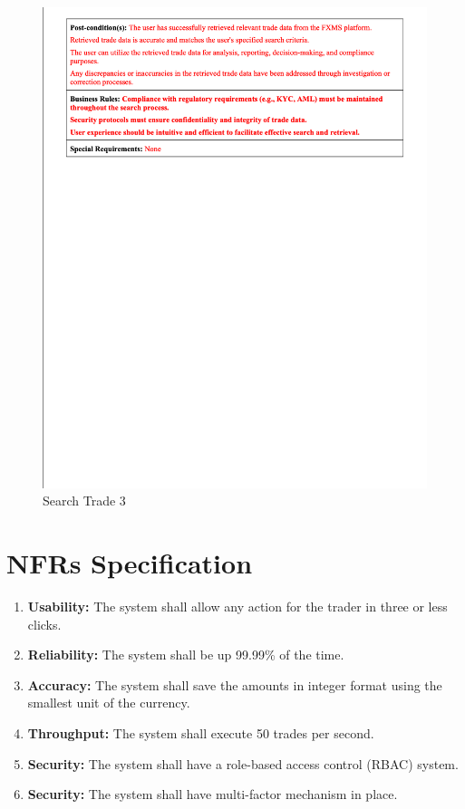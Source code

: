 \documentclass[a4paper]{report}
\begin{document}
\begin{figure}[h!]
    \centering
    \includegraphics[width=\textwidth]{images/uc/11.3-search-trade.png}
    \caption{Search Trade 3}
    \label{fig:11.3-search-trade}
\end{figure}

\chapter{NFRs Specification}

\begin{enumerate}
    \item \textbf{Usability:} The system shall allow any action for the trader in three or less clicks.
    \item \textbf{Reliability:} The system shall be up 99.99\% of the time.
    \item \textbf{Accuracy:} The system shall save the amounts in integer format using the smallest unit of the currency.
    \item \textbf{Throughput:} The system shall execute 50 trades per second.
    \item \textbf{Security:} The system shall have a role-based access control (RBAC) system.
    \item \textbf{Security:} The system shall have multi-factor mechanism in place.
\end{enumerate}
\end{document}
